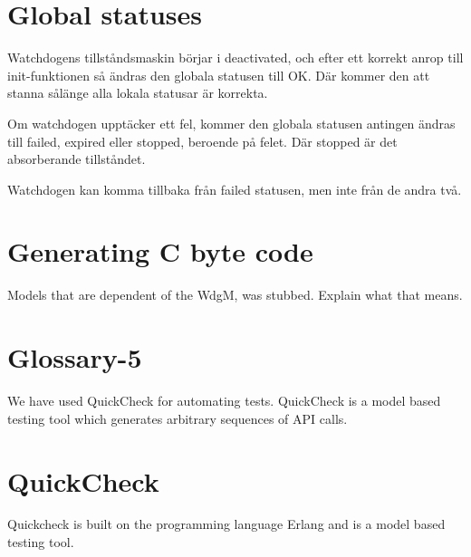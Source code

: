\documentclass[a4paper]{article}
\begin{document}
\section{Global statuses}
Watchdogens tillståndsmaskin börjar i deactivated, och efter ett
korrekt anrop till init-funktionen så ändras den globala statusen till
OK.
Där kommer den att stanna sålänge alla lokala statusar är korrekta.

Om watchdogen upptäcker ett fel, kommer den globala statusen
antingen ändras till failed, expired eller stopped, beroende på
felet. Där stopped är det absorberande tillståndet.

Watchdogen kan komma tillbaka från failed statusen, men inte från de
andra två.







\section{Generating C byte code}
Models that are dependent of the WdgM, was stubbed. Explain what that means.

\section{Glossary-5}
We have used QuickCheck for automating tests. QuickCheck is a model
based testing tool which generates arbitrary sequences of API calls.


\section{QuickCheck}
Quickcheck is built on the programming language Erlang and is a model based
testing tool.
\end{document}
